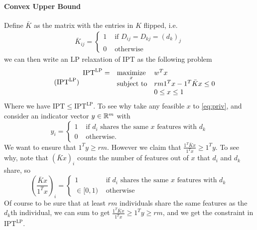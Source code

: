\documentclass[12pt]{article}
\newcommand{\priv}{\text{IPT}}
\newcommand{\privl}{\text{IPT}^\text{LP}}
\begin{document}
\paragraph{Convex Upper Bound}
Define $\bar{K}$ as the matrix with the entries in $K$ flipped, i.e.
\begin{align*}
    \bar{K}_{ij} = \begin{cases}
        1 & \text{ if } D_{ij} = D_{kj} = (d_k)_j\\
        0 & \text{ otherwise}
    \end{cases}
\end{align*} 
we can then write an \gls{LP} relaxation of \gls{IPT} as the following problem
\begin{equation}
	\label{eq:privs_k} 
    \tag{$\privl$} 
	\begin{array}{lll}
		\privl = & \underset{x}{\text{maximize}} & w^T x \\
		& \mbox{subject to} & rm 1^Tx - 1^T\bar{K}x \leq 0 \\
        && 0\leq x \leq 1
		\end{array}
\end{equation}
Where we have $\priv \leq \privl$. To see why take any feasible $x$ to \eqref{eq:priv}, and consider an indicator vector $y \in \mathbb{R}^m$ with 
\[y_i = \begin{cases}
     1 & \text{ if } d_i \text{ shares the same } x \text{ features with } d_k \\
    0 & \text{ otherwise.}
\end{cases}
\]
 We want to ensure that $1^T y \geq rm$. However we claim that $\frac{1^T \bar{K}x}{1^Tx} \geq 1^T y$. To see why, note that $(\bar{K}x)_i$ counts the number of features out of $x$ that $d_i$ and $d_k$ share, so 
\[\left(\frac{\bar{K}x}{1^T x}\right)_i = 
\begin{cases}
    1 & \text{ if } d_i \text{ shares the same } x \text{ features with } d_k \\
    \in [0,1) & \text{ otherwise}
\end{cases}\]
Of course to be sure that at least $rm$ individuals share the same features as the $d_k$th individual, we can sum to get $\frac{1^T\bar{K}x}{1^T x} \geq 1^Ty \geq rm$, and we get the constraint in $\privl$. 
\end{document}
